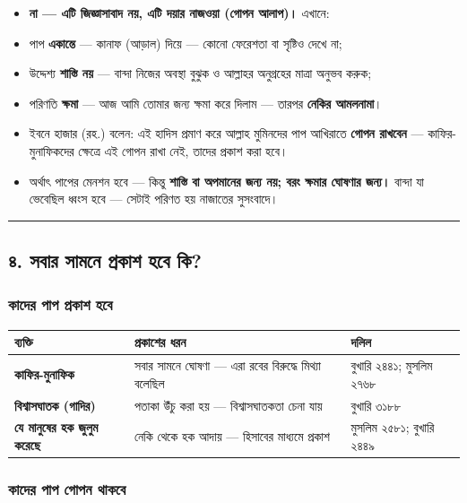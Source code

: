 \begin{itemize}
\item \textbf{না — এটি জিজ্ঞাসাবাদ নয়, এটি দয়ার নাজওয়া (গোপন আলাপ)।} এখানে:
\item পাপ \textbf{একান্তে} — কানাফ (আড়াল) দিয়ে — কোনো ফেরেশতা বা সৃষ্টিও দেখে না;
\item উদ্দেশ্য \textbf{শাস্তি নয়} — বান্দা নিজের অবস্থা বুঝুক ও আল্লাহর অনুগ্রহের মাত্রা অনুভব করুক;
\item পরিণতি \textbf{ক্ষমা} — আজ আমি তোমার জন্য ক্ষমা করে দিলাম — তারপর \textbf{নেকির আমলনামা}।
\item ইবনে হাজার (রহ.) বলেন: এই হাদিস প্রমাণ করে আল্লাহ মুমিনদের পাপ আখিরাতে \textbf{গোপন রাখবেন} — কাফির-মুনাফিকদের ক্ষেত্রে এই গোপন রাখা নেই, তাদের প্রকাশ করা হবে।
\item অর্থাৎ পাপের মেনশন হবে — কিন্তু \textbf{শাস্তি বা অপমানের জন্য নয়; বরং ক্ষমার ঘোষণার জন্য।} বান্দা যা ভেবেছিল ধ্বংস হবে — সেটাই পরিণত হয় নাজাতের সুসংবাদে।
\end{itemize}
\medskip\hrule\medskip

\subsection*{৪. সবার সামনে প্রকাশ হবে কি?}

\subsubsection*{কাদের পাপ প্রকাশ হবে}

\begin{table}[h]\centering\small
\begin{tabular}{lll}
ব্যক্তি & প্রকাশের ধরন & দলিল \\
\hline
\textbf{কাফির-মুনাফিক} & সবার সামনে ঘোষণা — \lat{“}এরা রবের বিরুদ্ধে মিথ্যা বলেছিল\lat{”} & বুখারি ২৪৪১; মুসলিম ২৭৬৮ \\
\textbf{বিশ্বাসঘাতক (গাদির)} & পতাকা উঁচু করা হয় — বিশ্বাসঘাতকতা চেনা যায় & বুখারি ৩১৮৮ \\
\textbf{যে মানুষের হক জুলুম করেছে} & নেকি থেকে হক আদায় — হিসাবের মাধ্যমে প্রকাশ & মুসলিম ২৫৮১; বুখারি ২৪৪৯ \\
\hline
\end{tabular}
\end{table}

\subsubsection*{কাদের পাপ গোপন থাকবে}

